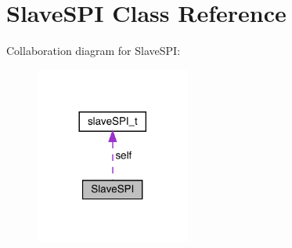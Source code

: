 \hypertarget{classSlaveSPI}{}\section{Slave\+S\+PI Class Reference}
\label{classSlaveSPI}


Collaboration diagram for Slave\+S\+PI\+:\nopagebreak
\begin{figure}[H]
\begin{center}
\leavevmode
\includegraphics[width=144pt]{classSlaveSPI__coll__graph}
\end{center}
\end{figure}
